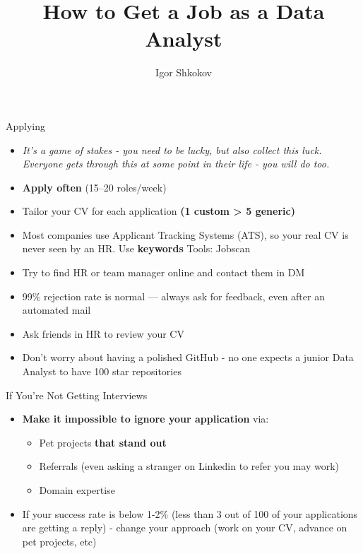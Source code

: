 \documentclass[10pt,a4paper]{article}
\date{} %
\title{How to Get a Job as a \textbf{Data Analyst}}
\author{Igor Shkokov}
\begin{document}
\small
\begin{multicols}{3}

\maketitle
\thispagestyle{empty}
\scriptsize

\begin{textbox}{Applying} 

\begin{itemize}                                                    
    \item \emph{It's a game of stakes - you need to be lucky, but also collect this luck. Everyone gets through this at some point in their life - you will do too.}
    \item \textbf{Apply often} (15–20 roles/week)
    \item Tailor your CV for each application \textbf{(1 custom > 5 generic)}
    \item Most companies use Applicant Tracking Systems (ATS), so your real CV is never seen by an HR. Use \textbf{keywords} Tools: Jobscan
    \item Try to find HR or team manager online and contact them in DM
    \item 99\% rejection rate is normal — always ask for feedback, even after an automated mail
    \item Ask friends in HR to review your CV
    \item Don't worry about having a polished GitHub - no one expects a junior Data Analyst to have 100 star repositories
\end{itemize}

\end{textbox}	

\begin{textboxGray}{If You're Not Getting Interviews}
\begin{itemize}
    \item \textbf{Make it impossible to ignore your application} via:
    \begin{itemize}
        \item Pet projects \textbf{that stand out}
        \item Referrals (even asking a stranger on Linkedin to refer you may work)
        \item Domain expertise
    \end{itemize}
    \item If your success rate is below 1-2\% (less than 3 out of 100 of your applications are getting a reply) - change your approach (work on your CV, advance on pet projects, etc)
\end{itemize}
\end{textboxGray}


\end{multicols}
\end{document}
